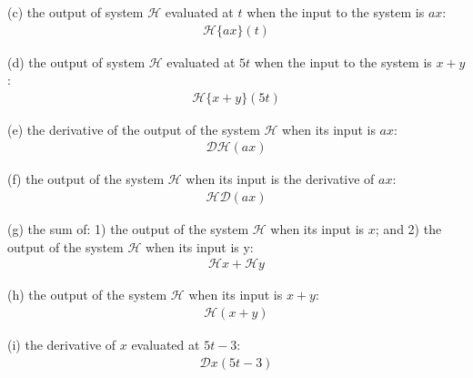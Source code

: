 \documentclass{article}
\begin{document}
(c)
the output of system $\mathcal{H}$ evaluated at $t$ when the input to the system is $ax$:
\begin{equation*}
\begin{split}
    \mathcal{H}\{ax\}(t)
\end{split}
\end{equation*}

(d)
the output of system $\mathcal{H}$ evaluated at $5t$ when the input to the system is $x + y$:
\begin{equation*}
\begin{split}
    \mathcal{H}\{x + y\}(5t)
\end{split}
\end{equation*}

(e)
the derivative of the output of the system $\mathcal{H}$ when its input is $ax$:
\begin{equation*}
\begin{split}
    \mathcal{D}\mathcal{H}(ax)
\end{split}
\end{equation*}

(f)
the output of the system $\mathcal{H}$ when its input is the derivative of $ax$:
\begin{equation*}
\begin{split}
    \mathcal{H}\mathcal{D}(ax)
\end{split}
\end{equation*}

(g)
the sum of: 1) the output of the system $\mathcal{H}$ when its input is $x$; and 2) the output of the system $\mathcal{H}$ when its input is y:
\begin{equation*}
\begin{split}
    \mathcal{H}x + \mathcal{H}y
\end{split}
\end{equation*}

(h)
the output of the system $\mathcal{H}$ when its input is $x + y$:
\begin{equation*}
\begin{split}
    \mathcal{H}(x + y)
\end{split}
\end{equation*}

(i)
the derivative of $x$ evaluated at $5t - 3$:
\begin{equation*}
\begin{split}
    \mathcal{D}x (5t - 3)\\
\end{split}
\end{equation*}
\end{document}

